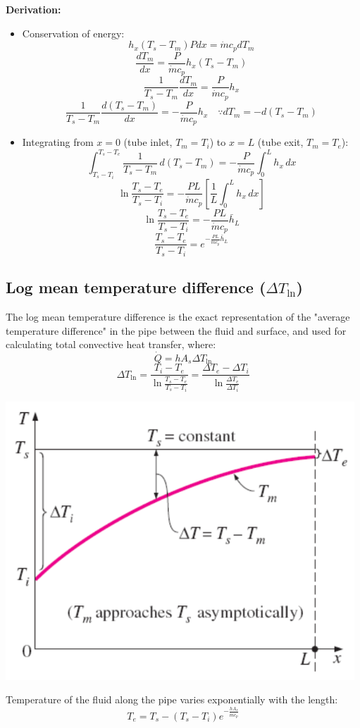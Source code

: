 \documentclass[11pt]{article}
\begin{document}
 \newpage

\textbf{Derivation:}
\begin{itemize}
\item Conservation of energy:
\[h_x (T_s - T_m) P dx = \dot{m} c_p dT_m\]
\[\frac{dT_m}{dx} = \frac{P}{\dot{m} c_p} h_x (T_s - T_m)\]
\[\frac{1}{T_s - T_m} \frac{dT_m}{dx} = \frac{P}{\dot{m} c_p} h_x\]
\[\frac{1}{T_s - T_m} \frac{d(T_s - T_m)}{dx} = -\frac{P}{\dot{m} c_p} h_x \quad \because dT_m = -d(T_s - T_m)\]
\item Integrating from \(x = 0\) (tube inlet, \(T_m = T_i\)) to \(x = L\) (tube exit, \(T_m = T_e\)):
\[\int_{T_s - T_i}^{T_s - T_e} \frac{1}{T_s - T_m} \, d(T_s - T_m) = - \frac{P}{\dot{m} c_p} \int_0^L h_x \, dx\]
\[\ln \frac{T_s - T_e}{T_s - T_i} = - \frac{PL}{\dot{m} c_p} \left[\frac{1}{L} \int_0^L h_x \, dx \right]\]
\[\ln \frac{T_s - T_e}{T_s - T_i} = - \frac{PL}{\dot{m} c_p} \bar{h}_L\]
\[\frac{T_s - T_e}{T_s - T_i} = e^{-\frac{PL}{\dot{m} c_p} \bar{h}_L}\]
\end{itemize}

 \newpage

\subsection{Log mean temperature difference (\(\Delta T_{\ln}\))}
\label{sec:orga459680}
The log mean temperature difference is the exact representation of the "average temperature difference" in the pipe between the fluid and surface, and used for calculating total convective heat transfer, where:
\[\dot{Q} = h A_s \Delta T_{\ln}\]
\[\Delta T_{\ln} = \frac{T_i - T_e}{\ln \frac{T_s - T_e}{T_s - T_i}} = \frac{\Delta T_e - \Delta T_i}{\ln \frac{\Delta T_e}{\Delta T_i}}\]
\begin{center}
\includegraphics[width=.9\linewidth]{./images/log-mean-temperature-difference-graph.png}
\end{center}
Temperature of the fluid along the pipe varies exponentially with the length:
\[T_e = T_s - (T_s - T_i) e^{-\frac{h A_s}{\dot{m} c_p}}\]
\end{document}
